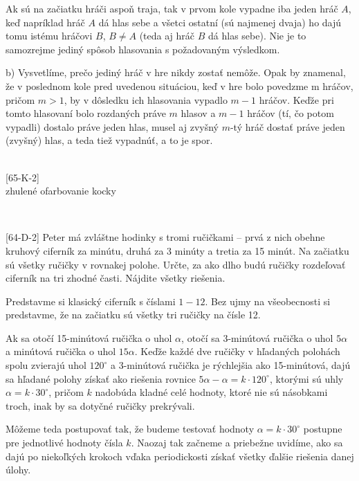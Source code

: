 Ak sú na začiatku hráči aspoň traja, tak v prvom kole vypadne iba jeden hráč $A$, keď napríklad hráč $A$ dá hlas sebe a všetci ostatní (sú najmenej dvaja) ho dajú tomu istému hráčovi $B$, $B \neq A$ (teda aj hráč $B$ dá hlas sebe). Nie je to samozrejme jediný spôsob hlasovania s požadovaným výsledkom.

b) Vysvetlíme, prečo jediný hráč v hre nikdy zostať nemôže. Opak by znamenal, že v poslednom kole pred uvedenou situáciou, keď v hre bolo povedzme m hráčov, pričom $m > 1$, by v dôsledku ich hlasovania vypadlo $m - 1$ hráčov. Keďže pri tomto hlasovaní bolo rozdaných práve $m$ hlasov a $m - 1$ hráčov (tí, čo potom vypadli) dostalo práve jeden hlas, musel aj zvyšný $m$-tý hráč dostať práve jeden (zvyšný) hlas, a teda tiež vypadnúť, a to je spor.\\
\\
\begin{tcolorbox}[breakable,notitle,boxrule=0pt,colback=light-gray,colframe=light-gray]\ul [65-K-2]\\
zhulené ofarbovanie kocky
\end{tcolorbox}
\\
\begin{tcolorbox}[breakable,notitle,boxrule=0pt,colback=light-gray,colframe=light-gray]\ul [64-D-2] Peter má zvláštne hodinky s tromi ručičkami -- prvá z nich obehne kruhový ciferník za minútu, druhá za 3 minúty a tretia za 15 minút. Na začiatku sú všetky ručičky v rovnakej polohe. Určte, za ako dlho budú ručičky rozdeľovať ciferník na tri zhodné časti. Nájdite všetky riešenia.

\end{tcolorbox}

\rieh Predstavme si klasický ciferník s číslami $1 - 12$. Bez ujmy na všeobecnosti si predstavme, že na začiatku sú všetky tri ručičky na čísle 12.

Ak sa otočí 15-minútová ručička o uhol $\alpha$, otočí sa 3-minútová ručička o uhol $5\alpha$ a minútová ručička o uhol $15\alpha$. Keďže každé dve ručičky v hľadaných polohách spolu
zvierajú uhol $120^{\circ}$ a 3-minútová ručička je rýchlejšia ako 15-minútová, dajú sa hľadané polohy získať ako riešenia rovnice $5\alpha-\alpha = k \cdot 120^{\circ}$, ktorými sú uhly $\alpha = k \cdot 30^{\circ}$, pričom $k$ nadobúda kladné celé hodnoty, ktoré nie sú násobkami troch, inak by sa dotyčné
ručičky prekrývali.

Môžeme teda postupovať tak, že budeme testovať hodnoty $\alpha = k\cdot 30^{\circ}$ postupne pre jednotlivé hodnoty čísla $k$. Naozaj tak začneme a priebežne uvidíme, ako sa dajú po niekoľkých krokoch vďaka periodickosti získať všetky ďalšie riešenia danej úlohy.

